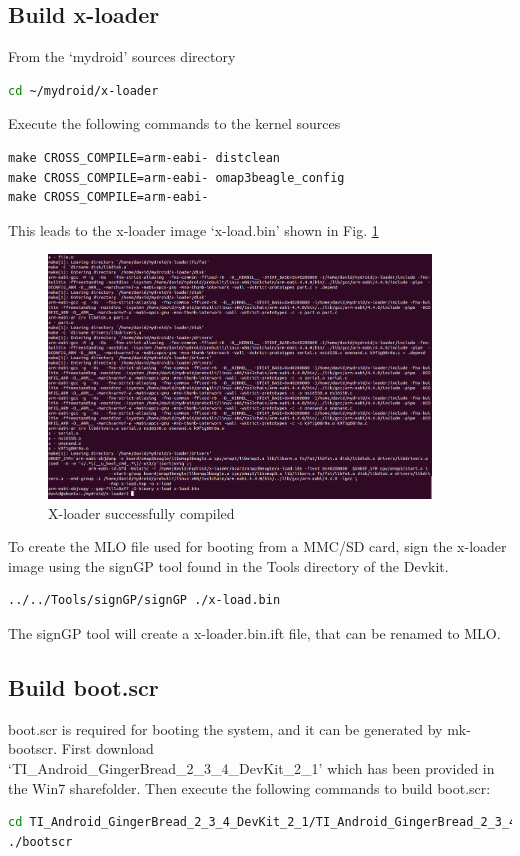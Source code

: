 \documentclass[10pt,journal,draftclsnofoot,onecolumn]{IEEEtran}
\begin{document}
\subsection{Build x-loader}
From the `mydroid' sources directory

\begin{lstlisting}[language={bash}]
cd ~/mydroid/x-loader
\end{lstlisting}

Execute the following commands to the kernel sources

\begin{lstlisting}[language={make}]
make CROSS_COMPILE=arm-eabi- distclean
make CROSS_COMPILE=arm-eabi- omap3beagle_config
make CROSS_COMPILE=arm-eabi-
\end{lstlisting}

This leads to the x-loader image `x-load.bin' shown in Fig. \ref{x-loader}

\begin{figure}[ht]
	\centering
	\includegraphics[width=4in]{./figs/x-loader.png}
	\caption{X-loader successfully compiled}
	\label{x-loader}
\end{figure}

To create the MLO file used for booting from a MMC/SD card, sign the x-loader image using the signGP tool found
in the Tools directory of the Devkit. 

\begin{lstlisting}[language={bash}]
../../Tools/signGP/signGP ./x-load.bin
\end{lstlisting}

The signGP tool will create a x-loader.bin.ift file, that can be renamed to MLO.

\subsection{Build boot.scr}
boot.scr is required for booting the system, and it can be generated by mk-bootscr.
First download \\`TI\_Android\_GingerBread\_2\_3\_4\_DevKit\_2\_1' which has been provided in the Win7 sharefolder.
Then execute the following commands to build boot.scr:
\begin{lstlisting}[language={bash}]
cd TI_Android_GingerBread_2_3_4_DevKit_2_1/TI_Android_GingerBread_2_3_4_DevKit_2_1/Tools/mk-bootscr/
./bootscr
\end{lstlisting}
 
\end{document}
